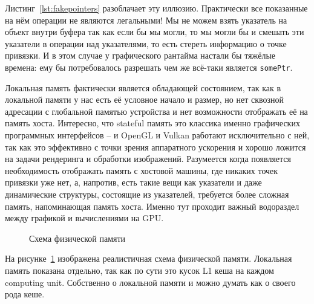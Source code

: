 Листинг~\cref{lst:fakepointers} разоблачает эту иллюзию. Практически все показанные на нём операции не являются легальными! Мы не можем взять указатель на объект внутри буфера так как если бы мы могли, то мы могли бы и смешать эти указатели в операции над указателями, то есть стереть информацию о точке привязки. И в этом случае у графического рантайма настали бы тяжёлые времена: ему бы потребовалось разрешать чем же всё-таки является \lstinline!somePtr!.

Локальная память фактически является обладающей состоянием, так как в локальной памяти у нас есть её условное начало и размер, но нет сквозной адресации с глобальной памятью устройства и нет возможности отображать её на память хоста. Интересно, что stateful память это классика именно графических программных интерфейсов -- и OpenGL \cite{kessenich2016opengl} и Vulkan \cite{sellers2016vulkan} работают исключительно с ней, так как это эффективно с точки зрения аппаратного ускорения и хорошо ложится на задачи рендеринга и обработки изображений. Разумеется когда появляется необходимость отображать память с хостовой машины, где никаких точек привязки уже нет, а, напротив, есть такие вещи как указатели и даже динамические структуры, состоящие из указателей, требуется более сложная память, напоминающая память хоста. Именно тут проходит важный водораздел между графикой и вычислениями на GPU.

\begin{figure}[ht]
    \caption{Схема физической памяти}\label{fig:memory-scheme}
\end{figure}

На рисунке~\ref{fig:memory-scheme} изображена реалистичная схема физической памяти. Локальная память показана отдельно, так как по сути это кусок L1 кеша на каждом computing unit. Собственно о локальной памяти и можно думать как о своего рода кеше.


